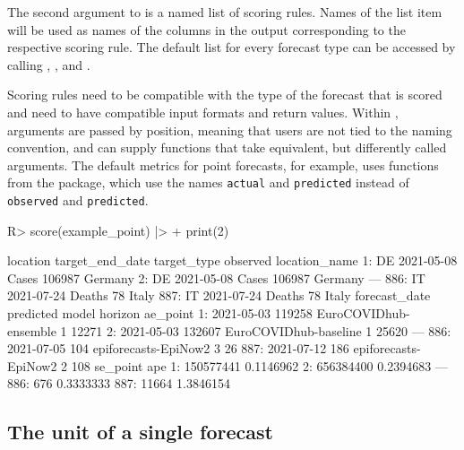 \documentclass[
]{jss}
\begin{document}
The second argument to  is a named list of scoring rules.
Names of the list item will be used as names of the columns in the
output corresponding to the respective scoring rule. The default list
for every forecast type can be accessed by calling
, ,
 and .

Scoring rules need to be compatible with the type of the forecast that
is scored and need to have compatible input formats and return values.
Within , arguments are passed by position, meaning that
users are not tied to the  naming convention, and can
supply functions that take equivalent, but differently called arguments.
The default metrics for point forecasts, for example, uses functions
from the  package, which use the names \texttt{actual} and
\texttt{predicted} instead of \texttt{observed} and \texttt{predicted}.

\begin{CodeChunk}
\begin{CodeInput}
R> score(example_point) |>
+   print(2)
\end{CodeInput}
\begin{CodeOutput}
     location target_end_date target_type observed location_name
  1:       DE      2021-05-08       Cases   106987       Germany
  2:       DE      2021-05-08       Cases   106987       Germany
 ---                                                            
886:       IT      2021-07-24      Deaths       78         Italy
887:       IT      2021-07-24      Deaths       78         Italy
     forecast_date predicted                 model horizon ae_point
  1:    2021-05-03    119258 EuroCOVIDhub-ensemble       1    12271
  2:    2021-05-03    132607 EuroCOVIDhub-baseline       1    25620
 ---                                                               
886:    2021-07-05       104  epiforecasts-EpiNow2       3       26
887:    2021-07-12       186  epiforecasts-EpiNow2       2      108
      se_point       ape
  1: 150577441 0.1146962
  2: 656384400 0.2394683
 ---                    
886:       676 0.3333333
887:     11664 1.3846154
\end{CodeOutput}
\end{CodeChunk}

\subsection[The unit of a single forecast]{The unit of a single
forecast}\label{sec:forecastunit}
\end{document}
